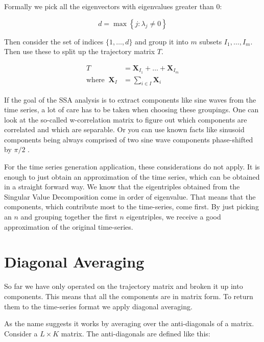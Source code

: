 Formally we pick all the eigenvectors with eigenvalues greater than 0:

\begin{equation}
  d=\max \left\{j: \lambda_{j} \neq 0\right\} 
\end{equation}

Then consider the set of indices $\{1, \ldots, d\}$ and group it into $m$ subsets $I_1, \ldots, I_m$. Then use these to split up the trajectory matrix $T$. 

\begin{equation}
   \begin{aligned}
      T&=\mathbf{X}_{I_{1}}+\ldots+\mathbf{X}_{I_{m}} \\
      \text{where} \;\; \mathbf{X}_{I}&=\sum_{i \in I} \mathbf{X}_{i}
   \end{aligned}
\end{equation}
  
If the goal of the SSA analysis is to extract components like sine waves from the time series, a lot of care has to be taken when choosing these groupings. One can look at the so-called w-correlation matrix to figure out which components are correlated and which are separable. Or you can use known facts like sinusoid components being always comprised of two sine wave components phase-shifted by $\pi/2$ \parencite{golyandina2014basic}.

For the time series generation application, these considerations do not apply. It is enough to just obtain an approximation of the time series, which can be obtained in a straight forward way. We know that the eigentriples obtained from the Singular Value Decomposition come in order of eigenvalue. That means that the components, which contribute most to the time-series, come first. By just picking an $n$ and grouping together the first $n$ eigentriples, we receive a good approximation of the original time-series.

\section{Diagonal Averaging}

So far we have only operated on the trajectory matrix and broken it up into components. This means that all the components are in matrix form. To return them to the time-series format we apply diagonal averaging. 

As the name suggests it works by averaging over the anti-diagonals of a matrix. Consider a $L\times K$ matrix. The anti-diagonals are defined like this: 

